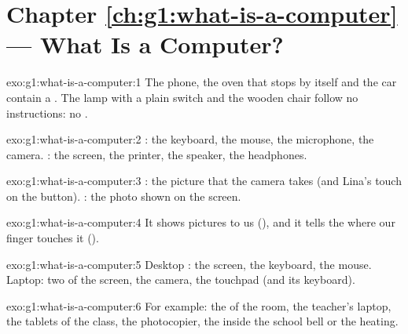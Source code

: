 \section*{Chapter \ref{ch:g1:what-is-a-computer} --- What Is a Computer?}

\begin{solution}{exo:g1:what-is-a-computer:1}
The phone, the oven that stops by itself and the car contain a . The
lamp with a plain switch and the wooden chair follow no instructions: no
.
\end{solution}

\begin{solution}{exo:g1:what-is-a-computer:2}
: the keyboard, the mouse, the microphone, the camera. : the screen, the printer, the speaker, the headphones.
\end{solution}

\begin{solution}{exo:g1:what-is-a-computer:3}
: the picture that the camera takes (and Lina's touch on the button).
: the photo shown on the screen.
\end{solution}

\begin{solution}{exo:g1:what-is-a-computer:4}
It shows pictures to us (), and it tells the  where our finger
touches it ().
\end{solution}

\begin{solution}{exo:g1:what-is-a-computer:5}
Desktop : the screen, the keyboard, the mouse. Laptop: two of the
screen, the camera, the touchpad (and its keyboard).
\end{solution}

\begin{solution}{exo:g1:what-is-a-computer:6}
For example: the  of the  room, the teacher's laptop, the
tablets of the class, the photocopier, the  inside the school bell or
the heating.
\end{solution}

